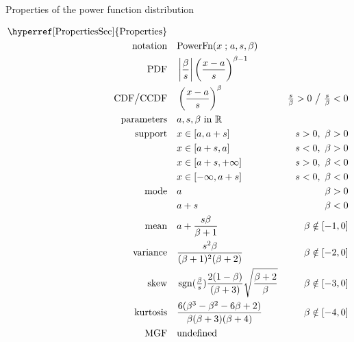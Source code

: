 

\begin{table*}[t!]
\caption[Power function distribution -- Properties]{Properties of the power function distribution}
\begin{align*}
\text{\hyperref[PropertiesSec]{Properties}}  \quad& \\
\text{notation}\quad &   \text{PowerFn}(x\given a,s,\beta) 
\\
\text{PDF}\quad &   \left|\frac{\beta}{ s}\right|\left(\frac{x-a}{s} \right)^{\beta -1}  \checked
\\
 \text{CDF}  \big/ \text{CCDF} \quad  &   \left(\frac{x-a}{s} \right)^{\beta } & \tfrac{s}{\beta}  >0 \ \big{/} \ \tfrac{s}{\beta}<0  \checked
\\
\text{parameters}\quad &   a, s, \beta \text{ in } \Real
\\
\text{support} \quad &    x \in [a,a+s] & s>0,\ \beta >0 \checked
 \\ 			 &  x\in[a+s,a] &s<0,\ \beta >0   \checked
 \\  			 &  x\in[a+s,+\infty]& s>0,\ \beta<0 \checked
 \\  			&  x\in[-\infty,a+s] & s<0,\ \beta<0  \checked
\\
\text{mode} \quad  & a & \beta >0 \checked
\\
& a+s & \beta <0  \checked
\\
\text{mean} \quad  &a+  \frac{s\beta}{\beta+1} &  \beta \notin [-1,0] \checked
\\
\text{variance} \quad  & \frac{ s^2 \beta }{ (\beta+1)^2 (\beta+2) } & \beta \notin [-2,0] \checked
\\
\text{skew} \quad  & \op{sgn}(\tfrac{\beta}{s}) \frac{2(1-\beta)}{(\beta+3)}  \sqrt{\frac{\beta+2}{\beta}}
& \beta \notin [-3,0] 
\\
\text{kurtosis} \quad  &  \frac{6(\beta^3-\beta ^2- 6 \beta +2)}{\beta(\beta +3)(\beta +4)} & \beta \notin [-4,0] \checked
\\
\text{MGF} \quad  &  \text{undefined}
\end{align*}
\end{table*}
